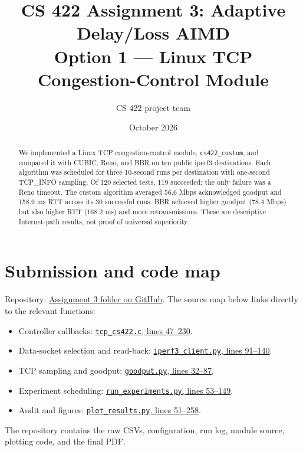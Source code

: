 \documentclass[11pt,letterpaper]{article}
\title{CS 422 Assignment 3: Adaptive Delay/Loss AIMD\\Option 1 --- Linux TCP Congestion-Control Module}
\author{CS 422 project team}
\date{October 2026}
\begin{document}
\maketitle

\begin{abstract}
We implemented a Linux TCP congestion-control module, \texttt{cs422\_custom},
and compared it with CUBIC, Reno, and BBR on ten public iperf3 destinations.
Each algorithm was scheduled for three 10-second runs per destination with
one-second TCP\_INFO sampling. Of 120 selected tests, 119 succeeded; the only
failure was a Reno timeout. The custom algorithm averaged 56.6 Mbps acknowledged
goodput and 158.9 ms RTT across its 30 successful runs. BBR achieved higher
goodput (78.4 Mbps) but also higher RTT (168.2 ms) and more retransmissions.
These are descriptive Internet-path results, not proof of universal superiority.
\end{abstract}

\section{Submission and code map}
Repository: \href{https://github.com/RohMalpani/CS422Assignments/tree/main/assignment3}{Assignment 3 folder on GitHub}.
The source map below links directly to the relevant functions:
\begin{itemize}
\item Controller callbacks:
\href{https://github.com/RohMalpani/CS422Assignments/blob/main/assignment3/kernel/tcp_cs422.c\#L47-L230}{\texttt{tcp\_cs422.c}, lines 47--230}.
\item Data-socket selection and read-back:
\href{https://github.com/RohMalpani/CS422Assignments/blob/main/assignment3/client/iperf3_client.py\#L91-L140}{\texttt{iperf3\_client.py}, lines 91--140}.
\item TCP sampling and goodput:
\href{https://github.com/RohMalpani/CS422Assignments/blob/main/assignment3/client/goodput.py\#L32-L87}{\texttt{goodput.py}, lines 32--87}.
\item Experiment scheduling:
\href{https://github.com/RohMalpani/CS422Assignments/blob/main/assignment3/run_experiments.py\#L53-L149}{\texttt{run\_experiments.py}, lines 53--149}.
\item Audit and figures:
\href{https://github.com/RohMalpani/CS422Assignments/blob/main/assignment3/plot_results.py\#L51-L258}{\texttt{plot\_results.py}, lines 51--258}.
\end{itemize}
The repository contains the raw CSVs, configuration, run log, module source,
plotting code, and the final PDF.
\end{document}
